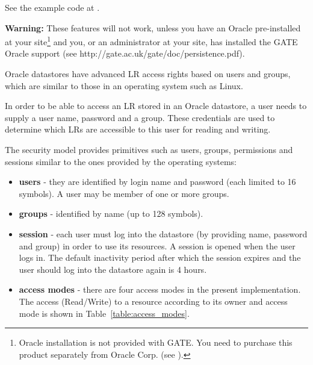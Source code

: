 See the example code at .



{\bf Warning:} These features will not work, unless you have an
Oracle pre-installed at your site\footnote{Oracle installation is
not provided with GATE. You need to purchase this product
separately from Oracle Corp. (see ).} and you, or an administrator at your
site, has installed the GATE Oracle support (see
http://gate.ac.uk/gate/doc/persistence.pdf).

Oracle datastores have advanced LR access rights based on users and
groups, which are similar to those in an operating system such as Linux.

In order to be able to access an LR stored in an Oracle datastore, a
user needs to supply a user name, password and a group. These
credentials are used to determine which LRs are accessible to this user
for reading and writing.


The security model provides primitives such as users, groups,
permissions and sessions similar to the ones provided by the
operating systems:

\begin{itemize}
    \item {\bf users} - they are identified by login name and password (each limited to 16 symbols).
    A user may be member of one or more groups.
    \item {\bf groups} - identified by name (up to 128 symbols).
    \item {\bf session} - each user must log into the datastore (by providing name, password and group) in order to use its resources.
    A session is opened when the user logs in. The default inactivity period after which the session expires and the user
    should log into the datastore again is 4 hours.
    \item {\bf access modes} -  there are four access modes in the present implementation.
    The access (Read/Write) to a resource
    according to its owner and access mode is shown in Table~\ref{table:access_modes}.
\end{itemize}

